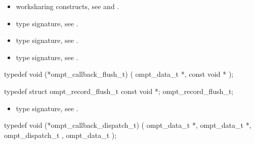 \codeptrdesc


\crossreferences
\begin{itemize}
\item worksharing constructs, see  and .
\item {} type signature, see
.
\item {} type signature, see
.
\item {} type signature, see
.
\end{itemize}



\label{sec:ompt_callback_flush_t}
\format

\begin{ccppspecific}
\begin{omptCallback}
typedef void (*ompt_callback_flush_t) (
  ompt_data_t *,
  const void *
);
\end{omptCallback}
\end{ccppspecific}


\record

\begin{ccppspecific}
\begin{omptRecord}
typedef struct ompt_record_flush_t {
  const void *;
} ompt_record_flush_t;
\end{omptRecord}
\end{ccppspecific}


\argdesc

\codeptrdesc

\crossreferences
\begin{itemize}
\item {} type signature, see
.
\end{itemize}



\label{sec:ompt_callback_dispatch_t}
\format

\begin{ccppspecific}
\begin{omptCallback}
typedef void (*ompt_callback_dispatch_t) (
  ompt_data_t *,
  ompt_data_t *,
  ompt_dispatch_t ,
  ompt_data_t  
);
\end{omptCallback}
\end{ccppspecific}


